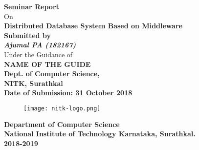\documentclass{article}[12pt,a4paper]
\begin{document}
\begin{titlepage}

    \centering
    \vspace{-3em}
    {\Large\textbf{Seminar Report}}\\
    \vspace{1.5em}
    On\\
    \vspace{1.5em}
    {\Huge \textbf{Distributed Database System Based on Middleware}}\\
    \vspace{3em}
    {\LARGE \bfseries Submitted by}\\
    \vspace{1em}
    {\Large \emph{\textbf{Ajumal PA (182167) }}}\\
    \vspace{3em}
    {\Large Under the Guidance of}\\
    \vspace{1em}
    {\Large \textbf{NAME OF THE GUIDE}}\\
    \vspace{2em}
    {\Large \textbf{Dept. of Computer Science,}}\\
    \vspace{2em}
    {\Large \textbf{NITK, Surathkal}}\\
    \vspace{4em}
    {\Large \textbf{Date of Submission: 31 October 2018}}\\
    \vspace{1.5em}
    \begin{figure}[!ht]
        \centering
        \texttt{[image: nitk-logo.png]}
    \end{figure}
    \vspace{2em}
    {\Large \bfseries Department of Computer Science}\\
    \vspace{0.5em}
    {\Large \bfseries National Institute of Technology Karnataka, Surathkal.}\\
    \vspace{0.5em}
    {\Large \bfseries 2018-2019}
\end{titlepage}

\end{document}
